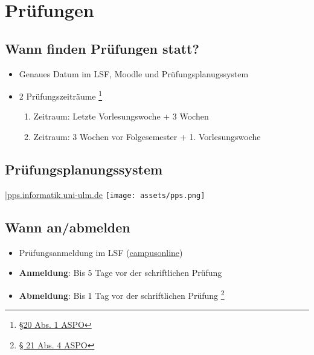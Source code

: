 \documentclass[
	aspectratio=169, 
	10pt 
]{beamer}
\begin{document}
\section{Prüfungen}
\subsection{Wann finden Prüfungen statt?}
\begin{frame}{\insertsubsection}
    \begin{itemize}
        \item Genaues Datum im LSF, Moodle und Prüfungsplanugssystem
        \item 2 Prüfungszeiträume \footnote{\href{https://www.uni-ulm.de/fileadmin/website_uni_ulm/zuv/zuv.dezIII.abt2u3/3-2oeffentlich/bekanntmachungen/2022/veroeffentlichung_asop_final.pdf}{§20 Abs. 1 ASPO}} \begin{enumerate} 
            \item Zeitraum: Letzte Vorlesungswoche + 3 Wochen
            \item Zeitraum: 3 Wochen vor Folgesemester + 1. Vorlesungswoche
        \end{enumerate}
    \end{itemize}
    
\end{frame}


\subsection{Prüfungsplanungssystem}
\begin{frame}{\insertsubsection \space|\space \underline{\href{https://pps.informatik.uni-ulm.de/index.php}{pps.informatik.uni-ulm.de}}}
    \texttt{[image: assets/pps.png]}
\end{frame}


\subsection{Wann an/abmelden}
\begin{frame}{\insertsubsection}
    \begin{itemize}
        \item Prüfungsanmeldung im LSF (\underline{\href{https://campusonline.uni-ulm.de}{campusonline}})
        \item \textbf{Anmeldung}: Bis 5 Tage vor der schriftlichen Prüfung
        \item \textbf{Abmeldung}: Bis 1 Tag vor der schriftlichen Prüfung \footnote{\href{https://www.uni-ulm.de/fileadmin/website_uni_ulm/zuv/zuv.dezIII.abt2u3/3-2oeffentlich/bekanntmachungen/2022/veroeffentlichung_asop_final.pdf}{§ 21 Abs. 4 ASPO}}
    \end{itemize}
\end{frame}
\end{document}
